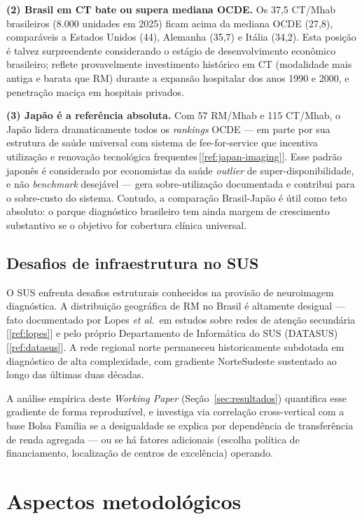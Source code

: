 \documentclass[12pt,a4paper,oneside]{article}
\begin{document}
\textbf{(2) Brasil em CT bate ou supera mediana OCDE.} Os 37,5
CT/Mhab brasileiros (8.000 unidades em 2025) ficam acima da
mediana OCDE (27,8), comparáveis a Estados Unidos (44),
Alemanha (35,7) e Itália (34,2). Esta posição é talvez surpreendente
considerando o estágio de desenvolvimento econômico brasileiro;
reflete provavelmente investimento histórico em CT (modalidade
mais antiga e barata que RM) durante a expansão hospitalar dos anos
1990 e 2000, e penetração maciça em hospitais privados.

\textbf{(3) Japão é a referência absoluta.} Com 57 RM/Mhab e 115
CT/Mhab, o Japão lidera dramaticamente todos os \textit{rankings}
OCDE — em parte por sua estrutura de saúde universal com sistema
de fee-for-service que incentiva utilização e renovação tecnológica
frequentes\,[\ref{ref:japan-imaging}]. Esse padrão japonês é
considerado por economistas da saúde \textit{outlier} de
super-disponibilidade, e não \textit{benchmark} desejável — gera
sobre-utilização documentada e contribui para o sobre-custo do
sistema. Contudo, a comparação Brasil-Japão é útil como teto
absoluto: o parque diagnóstico brasileiro tem ainda margem de
crescimento substantivo se o objetivo for cobertura clínica
universal.

\subsection{Desafios de infraestrutura no SUS}

O SUS enfrenta desafios estruturais conhecidos na provisão de
neuroimagem diagnóstica. A distribuição geográfica de RM no Brasil
é altamente desigual — fato documentado por Lopes \textit{et al.}\
em estudos sobre redes de atenção secundária\,[\ref{ref:lopes}] e
pelo próprio Departamento de Informática do SUS
(DATASUS)\,[\ref{ref:datasus}]. A rede regional norte permaneceu
historicamente subdotada em diagnóstico de alta complexidade, com
gradiente Norte\textendash Sudeste sustentado ao longo das últimas
duas décadas.

A análise empírica deste \textit{Working Paper} (Seção~\ref{sec:resultados})
quantifica esse gradiente de forma reproduzível, e investiga via
correlação cross-vertical com a base Bolsa Família se a
desigualdade se explica por dependência de transferência de renda
agregada — ou se há fatores adicionais (escolha política de
financiamento, localização de centros de excelência) operando.

\section{Aspectos metodológicos}\label{sec:metodo}
\end{document}
